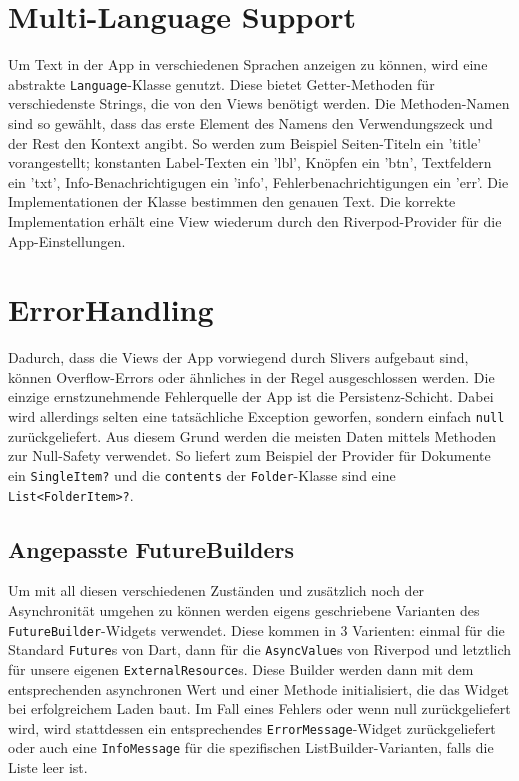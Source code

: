 \section{Multi-Language Support}

Um Text in der App in verschiedenen Sprachen anzeigen zu können, wird eine abstrakte \verb|Language|-Klasse genutzt. Diese bietet Getter-Methoden für verschiedenste Strings, die von den Views benötigt werden.
Die Methoden-Namen sind so gewählt, dass das erste Element des Namens den Verwendungszeck und der Rest den Kontext angibt. So werden zum Beispiel Seiten-Titeln ein 'title' vorangestellt; konstanten Label-Texten ein 'lbl', Knöpfen ein 'btn', Textfeldern ein 'txt', Info-Benachrichtigugen ein 'info', Fehlerbenachrichtigungen ein 'err'.
Die Implementationen der Klasse bestimmen den genauen Text. Die korrekte Implementation erhält eine View wiederum durch den Riverpod-Provider für die App-Einstellungen.

\section{ErrorHandling}

Dadurch, dass die Views der App vorwiegend durch Slivers aufgebaut sind, können Overflow-Errors oder ähnliches in der Regel ausgeschlossen werden.
Die einzige ernstzunehmende Fehlerquelle der App ist die Persistenz-Schicht. Dabei wird allerdings selten eine tatsächliche Exception geworfen, sondern einfach \verb|null| zurückgeliefert. Aus diesem Grund werden die meisten Daten mittels Methoden zur Null-Safety verwendet. So liefert zum Beispiel der Provider für Dokumente ein \verb|SingleItem?| und die \verb|contents| der \verb|Folder|-Klasse sind eine \verb|List<FolderItem>?|.

\subsection{Angepasste FutureBuilders} \label{sec:futures}

Um mit all diesen verschiedenen Zuständen und zusätzlich noch der Asynchronität umgehen zu können werden eigens geschriebene Varianten des \verb|FutureBuilder|-Widgets verwendet.
Diese kommen in 3 Varienten: einmal für die Standard \verb|Future|s von Dart, dann für die \verb|AsyncValue|s von Riverpod und letztlich für unsere eigenen \verb|ExternalResource|s.
Diese Builder werden dann mit dem entsprechenden asynchronen Wert und einer Methode initialisiert, die das Widget bei erfolgreichem Laden baut. Im Fall eines Fehlers oder wenn null zurückgeliefert wird, wird stattdessen ein entsprechendes \verb|ErrorMessage|-Widget zurückgeliefert oder auch eine \verb|InfoMessage| für die spezifischen ListBuilder-Varianten, falls die Liste leer ist.
